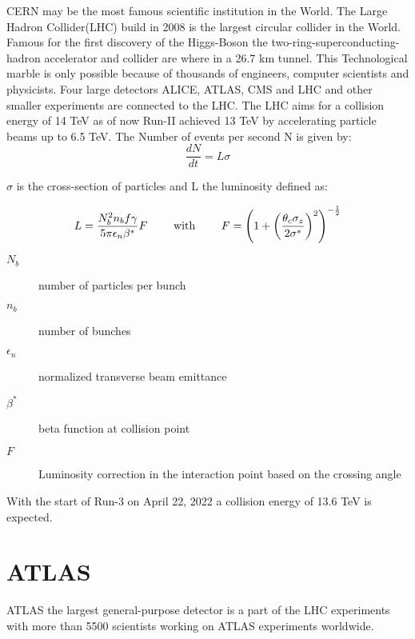 \documentclass[../Bachelorarbeit.tex]{subfiles}
\begin{document}
CERN may be the most famous scientific institution in the World. The Large Hadron Collider(LHC) build in 2008 is the largest circular collider in the World.
Famous for the first discovery of the Higgs-Boson the two-ring-superconducting-hadron accelerator and collider are where in a 26.7 km tunnel.
This Technological marble is only possible because of thousands of engineers, computer scientists and physicists.
Four large detectors ALICE, ATLAS, CMS and LHC and other smaller experiments are connected to the LHC.
The LHC aims for a collision energy of 14 TeV as of now Run-II achieved 13 TeV by accelerating particle beams up to 6.5 TeV.
The Number of events per second N is given by:
\begin{equation}
    \frac{dN}{dt} = L \sigma
\end{equation}

$\sigma$ is the cross-section of particles and L the luminosity defined as:

\begin{equation}
    L= \frac{N_{b}^{2} n_{b} f \gamma}{5 \pi \epsilon_{n} \beta^{*}} F \qquad \textnormal{ with } \qquad  F=\left( 1 + \left( \frac{\theta_{c} \sigma_{z}}{2 \sigma^{*}}\right)^{2} \right)^{-\frac{1}{2}}
\end{equation}
\begin{description}
    \item[$N_{b}$] number of particles per bunch
    \item[$n_{b}$]  number of bunches
    \item[$\epsilon_{n}$]  normalized transverse beam emittance
    \item[$\beta^{*}$] beta function at collision point
    \item[$F$] Luminosity correction in the interaction point based on the crossing angle
\end{description}
With the start of Run-3 on April 22, 2022 a collision energy of 13.6 TeV is expected.

\section{ATLAS}
ATLAS the largest general-purpose detector is a part of the LHC experiments with more than 5500 scientists working on
ATLAS experiments worldwide.
\end{document}
